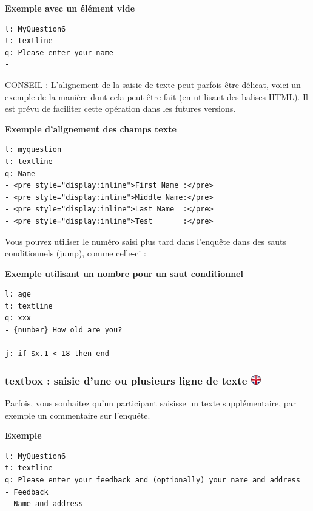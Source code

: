 \documentclass[
]{book}
\begin{document}
\textbf{Exemple avec un élément vide}

\begin{verbatim}
l: MyQuestion6
t: textline
q: Please enter your name
-
\end{verbatim}

CONSEIL : L'alignement de la saisie de texte peut parfois être délicat, voici un exemple de la manière dont cela peut être fait (en utilisant des balises HTML). Il est prévu de faciliter cette opération dans les futures versions.

\textbf{Exemple d'alignement des champs texte}

\begin{verbatim}
l: myquestion
t: textline
q: Name
- <pre style="display:inline">First Name :</pre>
- <pre style="display:inline">Middle Name:</pre>
- <pre style="display:inline">Last Name  :</pre>
- <pre style="display:inline">Test       :</pre>
\end{verbatim}

Vous pouvez utiliser le numéro saisi plus tard dans l'enquête dans des sauts conditionnels (jump), comme celle-ci :

\textbf{Exemple utilisant un nombre pour un saut conditionnel}

\begin{verbatim}
l: age
t: textline
q: xxx
- {number} How old are you?

j: if $x.1 < 18 then end
\end{verbatim}

\hypertarget{textbox-saisie-dune-ou-plusieurs-ligne-de-texte}{%
\subsubsection[textbox : saisie d'une ou plusieurs ligne de texte ]{\texorpdfstring{textbox : saisie d'une ou plusieurs ligne de texte \href{https://www.psytoolkit.org/doc3.2.0/online-survey-syntax.html\#textbox}{\protect\includegraphics{img/ukflag.png}}}{textbox : saisie d'une ou plusieurs ligne de texte }}\label{textbox-saisie-dune-ou-plusieurs-ligne-de-texte}}

Parfois, vous souhaitez qu'un participant saisisse un texte supplémentaire, par exemple un commentaire sur l'enquête.

\textbf{Exemple}

\begin{verbatim}
l: MyQuestion6
t: textline
q: Please enter your feedback and (optionally) your name and address
- Feedback
- Name and address
\end{verbatim}
\end{document}
